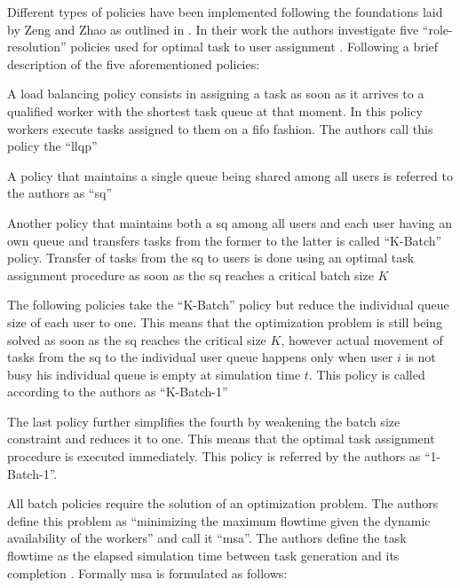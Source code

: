 \documentclass{seal_thesis}
\begin{document}
Different types of policies have been implemented following the foundations laid by Zeng and Zhao as outlined in . In their work the authors investigate five ``role-resolution'' policies used for optimal task to user assignment \cite[p. 7]{Zeng2005}. Following a brief description of the five aforementioned policies:
\begin{enumerate*}
	\item A load balancing policy consists in assigning a task as soon as it arrives to a qualified worker with the shortest task queue at that moment. In this policy workers execute tasks assigned to them on a \gls{fifo} fashion. The authors call this policy the ``\gls{llqp}''
	\item A policy that maintains a single queue being shared among all users is referred to the authors as ``\gls{sq}''
	\item Another policy that maintains both a \gls{sq} among all users and each user having an own queue and transfers tasks from the former to the latter is called ``K-Batch'' policy. Transfer of tasks from the \gls{sq} to users is done using an optimal task assignment procedure as soon as the \gls{sq} reaches a critical batch size $K$
	\item The following policies take the ``K-Batch'' policy but reduce the individual queue size of each user to one. This means that the optimization problem is still being solved as soon as the \gls{sq} reaches the critical size $K$, however actual movement of tasks from the \gls{sq} to the individual user queue happens only when user $i$ is not busy \ie his individual queue is empty at simulation time $t$. This policy is called according to the authors as ``K-Batch-1''
	\item The last policy further simplifies the fourth by weakening the batch size constraint and reduces it to one. This means that the optimal task assignment procedure is executed immediately. This policy is referred by the authors as ``1-Batch-1''.
\end{enumerate*}

All batch policies require the solution of an optimization problem. The authors define this problem as ``minimizing the maximum flowtime given the dynamic availability of the workers'' and call it ``\gls{msa}''\cite[p. 7]{Zeng2005}. The authors define the task flowtime as the elapsed simulation time between task generation and its completion \cite{Zeng2005,Baker1974}. Formally \gls{msa} is formulated as follows:
\end{document}
